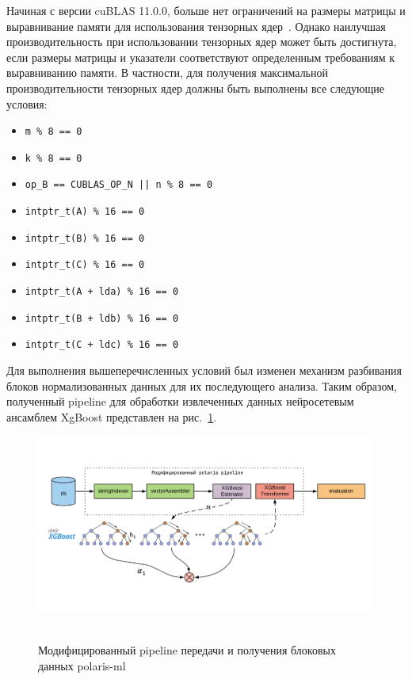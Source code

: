 \documentclass[14pt, a4paper]{extreport}
\begin{document}
    Начиная с версии cuBLAS 11.0.0, больше нет ограничений на размеры матрицы и выравнивание памяти для использования тензорных ядер~\cite{nvidia_cublas_docs}.
    Однако наилучшая производительность при использовании тензорных ядер может быть достигнута, если размеры матрицы и указатели соответствуют определенным требованиям к выравниванию памяти.
    В частности, для получения максимальной производительности тензорных ядер должны быть выполнены все следующие условия:

    \begin{itemize}
        \item \texttt{m \% 8 == 0}
        \item \texttt{k \% 8 == 0}
        \item \texttt{op\_B == CUBLAS\_OP\_N || n \% 8 == 0}
        \item \texttt{intptr\_t(A) \% 16 == 0}
        \item \texttt{intptr\_t(B) \% 16 == 0}
        \item \texttt{intptr\_t(C) \% 16 == 0}
        \item \texttt{intptr\_t(A + lda) \% 16 == 0}
        \item \texttt{intptr\_t(B + ldb) \% 16 == 0}
        \item \texttt{intptr\_t(C + ldc) \% 16 == 0}
    \end{itemize}

    Для выполнения вышеперечисленных условий был изменен механизм разбивания блоков нормализованных данных для их последующего анализа.
    Таким образом, полученный pipeline для обработки извлеченных данных нейросетевым ансамблем XgBoost представлен на рис.~\ref{fig:polaris_xgboost_pipeline}.

    \begin{figure}[!htbp]
        \centering
        \includegraphics[width=1.0\textwidth]{polaris_xgboost_pipeline}
        ~\caption{Модифицированный pipeline передачи и получения блоковых данных polaris-ml}
        \label{fig:polaris_xgboost_pipeline}
    \end{figure}
\end{document}
